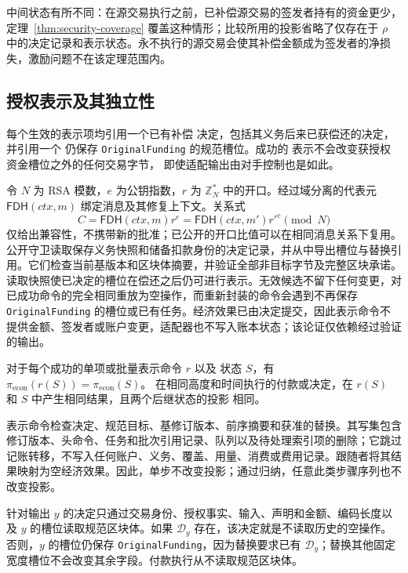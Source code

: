 中间状态有所不同：在源交易执行之前，已补偿源交易的签发者持有的资金更少，定理~\ref{thm:security-coverage} 覆盖这种情形；比较所用的投影省略了仅存在于 $\rho$ 中的决定记录和表示状态。永不执行的源交易会使其补偿金额成为签发者的净损失，激励问题不在该定理范围内。

\subsection{授权表示及其独立性}
\label{sec:security-repair}

\begin{lemma}[由决定约束的表示权限]
\label{lem:security-repair}
每个生效的表示项均引用一个已有补偿
决定，包括其义务后来已获偿还的决定，并引用一个
仍保存 \texttt{OriginalFunding} 的规范槽位。成功的
表示不会改变获授权资金槽位之外的任何交易字节，
即使适配输出由对手控制也是如此。
\end{lemma}
\begin{IEEEproof}
令 $N$ 为 RSA 模数，$e$ 为公钥指数，$r$ 为 $\mathbb Z_N^*$ 中的开口。经过域分离的代表元 $\mathsf{FDH}(ctx,m)$ 绑定消息及其修复上下文。关系式
\begin{equation}
 C=\mathsf{FDH}(ctx,m)r^e=\mathsf{FDH}(ctx,m')r'^e\pmod N
\end{equation}
仅给出兼容性，不携带新的批准；已公开的开口比值可以在相同消息关系下复用。公开守卫读取保存义务快照和储备扣款身份的决定记录，并从中导出槽位与替换引用。它们检查当前基版本和区块体摘要，并验证全部非目标字节及完整区块承诺。读取快照使已决定的槽位在偿还之后仍可进行表示。无效候选不留下任何变更，对已成功命令的完全相同重放为空操作，而重新封装的命令会遇到不再保存 \texttt{OriginalFunding} 的槽位或已有任务。经济效果已由决定提交，因此表示命令不提供金额、签发者或账户变更，适配器也不写入账本状态；该论证仅依赖经过验证的输出。
\end{IEEEproof}

\begin{lemma}[表示不产生经济影响]
\label{lem:security-representation}
对于每个成功的单项或批量表示命令 $r$ 以及
状态 $S$，有 $\pi_{\mathrm{econ}}(r(S))=\pi_{\mathrm{econ}}(S)$。
在相同高度和时间执行的付款或决定，在 $r(S)$
和 $S$ 中产生相同结果，且两个后继状态的投影
相同。
\end{lemma}
\begin{IEEEproof}
表示命令检查决定、规范目标、基修订版本、前序摘要和获准的替换。其写集包含修订版本、头命令、任务和批次引用记录、队列以及待处理索引项的删除；它跳过记账转移，不写入任何账户、义务、覆盖、用量、消费或费用记录。跟随者将其结果映射为空经济效果。因此，单步不改变投影；通过归纳，任意此类步骤序列也不改变投影。

针对输出 $y$ 的决定只通过交易身份、授权事实、输入、声明和金额、编码长度以及 $y$ 的槽位读取规范区块体。如果 $\mathcal D_y$ 存在，该决定就是不读取历史的空操作。否则，$y$ 的槽位仍保存 \texttt{OriginalFunding}，因为替换要求已有 $\mathcal D_y$；替换其他固定宽度槽位不会改变其余字段。付款执行从不读取规范区块体。
\end{IEEEproof}

